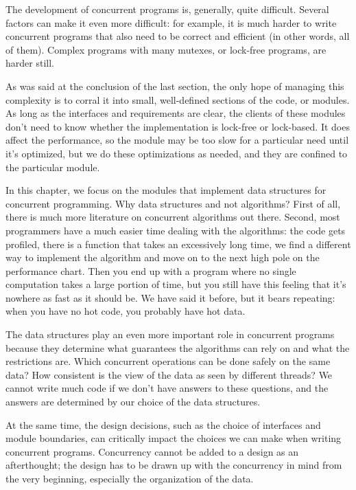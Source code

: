
The development of concurrent programs is, generally, quite difficult. Several factors can make it even more difficult: for example, it is much harder to write concurrent programs that also need to be correct and efficient (in other words, all of them). Complex programs with many mutexes, or lock-free programs, are harder still.

As was said at the conclusion of the last section, the only hope of managing this complexity is to corral it into small, well-defined sections of the code, or modules. As long as the interfaces and requirements are clear, the clients of these modules don't need to know whether the implementation is lock-free or lock-based. It does affect the performance, so the module may be too slow for a particular need until it's optimized, but we do these optimizations as needed, and they are confined to the particular module.

In this chapter, we focus on the modules that implement data structures for concurrent programming. Why data structures and not algorithms? First of all, there is much more literature on concurrent algorithms out there. Second, most programmers have a much easier time dealing with the algorithms: the code gets profiled, there is a function that takes an excessively long time, we find a different way to implement the algorithm and move on to the next high pole on the performance chart. Then you end up with a program where no single computation takes a large portion of time, but you still have this feeling that it's nowhere as fast as it should be. We have said it before, but it bears repeating: when you have no hot code, you probably have hot data.

The data structures play an even more important role in concurrent programs because they determine what guarantees the algorithms can rely on and what the restrictions are. Which concurrent operations can be done safely on the same data? How consistent is the view of the data as seen by different threads? We cannot write much code if we don't have answers to these questions, and the answers are determined by our choice of the data structures.

At the same time, the design decisions, such as the choice of interfaces and module boundaries, can critically impact the choices we can make when writing concurrent programs. Concurrency cannot be added to a design as an afterthought; the design has to be drawn up with the concurrency in mind from the very beginning, especially the organization of the data.

